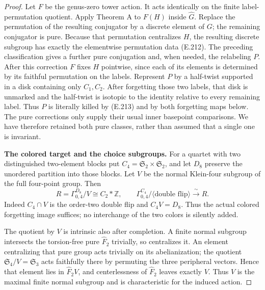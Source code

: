 \begin{proof}
Let $F$ be the genus-zero tower action.
It acts identically on the finite label-permutation quotient.
Apply Theorem A to $F(H)$ inside $\widehat G$.
Replace the permutation of the resulting conjugator by a
discrete element of $G$; the remaining conjugator is pure.
Because that permutation centralizes $H$, the resulting discrete
subgroup has exactly the elementwise permutation data (E.212).
The preceding classification gives a further pure conjugation
and, when needed, the relabeling $P$.
After this correction $F$ fixes $H$ pointwise, since each of its
elements is determined by its faithful permutation on the labels.
Represent $P$ by a half-twist supported in a disk containing only
$C_1,C_2$.  After forgetting those two labels, that disk is unmarked
and the half-twist is isotopic to the identity relative to every
remaining label.  Thus $P$ is literally killed by (E.213) and by
both forgetting maps below.
The pure corrections only supply their usual inner basepoint
comparisons.  We have therefore retained both pure classes,
rather than assumed that a single one is invariant.

\par\medskip\noindent\textbf{The colored target and the choice subgroups.}\quad
For a quartet with two distinguished two-element blocks put
$C_4=\mathfrak S_2\times\mathfrak S_2$, and let $D_8$ preserve the
unordered partition into those blocks.  Let $V$ be the normal
Klein-four subgroup of the full four-point group.  Then
\[
 R=\Gamma_{0,4}^{D_8}/V\cong C_2*\mathbb Z,\qquad
 \Gamma_{0,4}^{C_4}/\langle\text{double flip}\rangle
                  \xrightarrow{\ \sim\ }R.
                                                               \tag{E.215}
\]
Indeed $C_4\cap V$ is the order-two double flip and $C_4V=D_8$.
Thus the actual colored forgetting image suffices; no
interchange of the two colors is silently added.

The quotient by $V$ is intrinsic also after completion.
A finite normal subgroup intersects the torsion-free pure
$\widehat F_2$ trivially, so centralizes it.
An element centralizing that pure group acts trivially on its
abelianization; the quotient $\mathfrak S_4/V=\mathfrak S_3$
acts faithfully there by permuting the three peripheral vectors.
Hence that element lies in $\widehat F_2 V$, and centerlessness
of $\widehat F_2$ leaves exactly $V$.
Thus $V$ is the maximal finite normal subgroup and is
characteristic for the induced action.


\end{proof}
